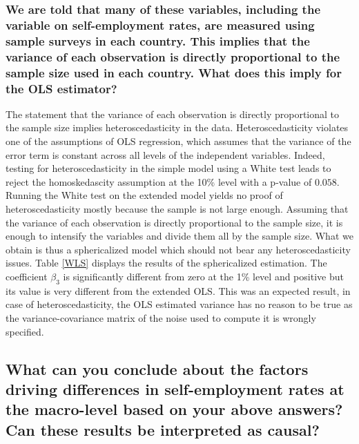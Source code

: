 \subsubsection{We are told that many of these variables, including the variable on self-employment rates, are measured using sample surveys in each country. This implies that the variance of each observation is directly proportional to the sample size used in each country. What does this imply for the OLS estimator?}
The statement that the variance of each observation is directly proportional to the sample size implies heteroscedasticity in the data. Heteroscedasticity violates one of the assumptions of OLS regression, which assumes that the variance of the error term is constant across all levels of the independent variables.
Indeed, testing for heteroscedasticity in the simple model using a White test leads to reject the homoskedascity assumption at the  10\% level with a p-value of $0.058$. Running the White test on the extended
model yields no proof of heteroscedasticity mostly because the sample is not large enough.
Assuming that the variance of each observation is directly proportional to the sample size,
it is enough to intensify the variables and divide them all by the sample size. What we obtain is thus
a sphericalized model which should not bear any heteroscedasticity issues. Table \ref{WLS} displays the results
of the sphericalized estimation.
The coefficient $\beta_3$ is significantly different from zero at the 1\% level and positive but its value is very different from the extended OLS. This was an expected result, in case of heteroscedasticity, the OLS estimated variance has no reason to be true as the variance-covariance matrix of the noise used to compute it is wrongly specified.

\subsection{What can you conclude about the factors driving differences in self-employment rates at the
macro-level based on your above answers? Can these results be interpreted as causal?}